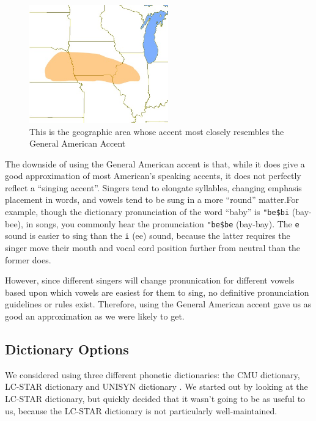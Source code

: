 \begin{center}
\begin{figure}
\includegraphics[width=60mm]{General_American.jpg}
\captionfonts
\caption[Geographic Origin of General American]{This is the geographic area whose accent most closely resembles the General American Accent \cite{generalAmericanAccentMap} }
\label{fig:generalAmericanMap}
\end{figure}
\end{center}
The downside of using the General American accent is that, while it does give a good approximation of most American's speaking accents, it does not perfectly reflect a ``singing accent''. Singers tend to elongate syllables, changing emphasis placement in words, and vowels tend to be sung in a more ``round'' matter\cite{onSingingAccentsDCblog}.For example, though the dictionary pronunciation of the word ``baby'' is \texttt{"be\$bi} (bay-bee), in songs, you commonly hear the pronunciation \texttt{"be\$be} (bay-bay). The \texttt{e} sound is easier to sing than the \texttt{i} (ee) sound, because the latter requires the singer move their mouth and vocal cord position further from neutral than the former does\cite{technicalDescriptionOfVowelSinging}.

However, since different singers will change pronunication for different vowels based upon which vowels are easiest for them to sing, no definitive pronunciation guidelines or rules exist. Therefore, using the General American accent gave us as good an approximation as we were likely to get\cite{whyAmericanEnglishIsNoAccent}.

\subsection{Dictionary Options}
\label{subsection:dictionaryOptions}

We considered using three different phonetic dictionaries: the CMU dictionary, LC-STAR dictionary and UNISYN dictionary\cite{lcStarWebsite} \cite{cmuDictWebsite}  \cite{unisynLexiconWebsite}.  We started out by looking at the LC-STAR dictionary, but quickly decided that it wasn’t going to be as useful to us, because the LC-STAR dictionary is not particularly well-maintained.  

